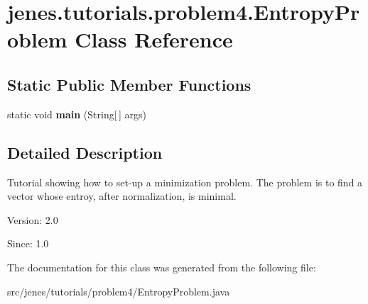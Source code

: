 \hypertarget{classjenes_1_1tutorials_1_1problem4_1_1_entropy_problem}{
\section{jenes.tutorials.problem4.EntropyProblem Class Reference}
\label{classjenes_1_1tutorials_1_1problem4_1_1_entropy_problem}
}
\subsection*{Static Public Member Functions}
\begin{CompactItemize}
\item 
\hypertarget{classjenes_1_1tutorials_1_1problem4_1_1_entropy_problem_9b806aeb673e0324764205d27487524f}{
static void \textbf{main} (String\mbox{[}$\,$\mbox{]} args)}
\label{classjenes_1_1tutorials_1_1problem4_1_1_entropy_problem_9b806aeb673e0324764205d27487524f}

\end{CompactItemize}


\subsection{Detailed Description}
Tutorial showing how to set-up a minimization problem. The problem is to find a vector whose entroy, after normalization, is minimal.

\begin{Desc}
\item[Version:]2.0 \end{Desc}
\begin{Desc}
\item[Since:]1.0 \end{Desc}


The documentation for this class was generated from the following file:\begin{CompactItemize}
\item 
src/jenes/tutorials/problem4/EntropyProblem.java\end{CompactItemize}
